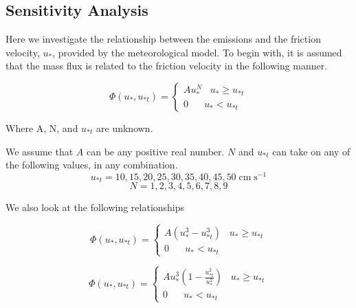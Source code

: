 \subsection{Sensitivity Analysis}

Here we investigate the relationship between the emissions and the friction velocity, $u_*$, provided by the meteorological model.
To begin with, it is assumed that the mass flux is related to the friction velocity in the following manner.

\begin{equation}
\Phi(u_*, u_{*t}) =\begin{cases}
Au_*^N \;\;\; u_{*} \geq u_{*t} \\
0 \;\;\;\;\;\;  u_* < u_{*t} 
\end{cases}
\label{eq:massflux}
\end{equation}

Where A, N, and $u_{*t}$ are unknown. 

We assume that $A$ can be any
positive real number. $N$ and $u_{*t}$ can take on any of the following values, in any combination.
$$ u_{*t} = 10,15,20,25,30,35,40,45,50 \; \mathrm{cm} \; \mathrm{s}^{-1}$$
$$ N = 1,2,3,4,5,6,7,8,9 $$

We also look at the following relationships

\begin{equation}
\Phi(u_*, u_{*t}) =\begin{cases}
A(u_*^3 - u_{*t}^3)  \;\;\; u_{*} \geq u_{*t} \\
0 \;\;\;\;\;\;  u_* < u_{*t} 
\end{cases}
\label{eq:leadbetter}
\end{equation}


\begin{equation}
\Phi(u_*, u_{*t}) =\begin{cases}
Au_*^3 (1-\frac{u_{*t}^2}{u_{*}^2})  \;\;\; u_{*} \geq u_{*t} \\
0 \;\;\;\;\;\;  u_* < u_{*t} 
\end{cases}
\label{eq:shao}
\end{equation}

